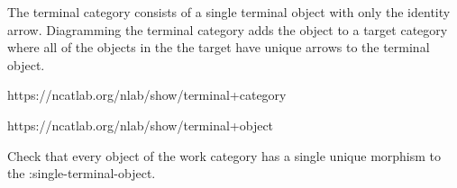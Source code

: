\documentclass{article}
\begin{document}
The terminal category consists of a
single terminal object with only the identity arrow.
Diagramming the terminal category adds the object to
a target category where all of the objects in
the the target have unique arrows to the terminal object.

https://ncatlab.org/nlab/show/terminal+category

https://ncatlab.org/nlab/show/terminal+object

Check that every object of the work category has a
single unique morphism to the :single-terminal-object.
\end{document}

